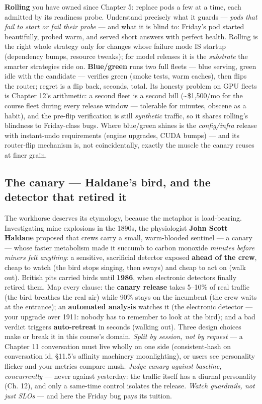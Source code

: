\textbf{Rolling} you have owned since Chapter 5: replace pods a few at a time, each admitted by its readiness probe. Understand precisely what it guards — \textit{pods that fail to start or fail their probe} — and what it is blind to: Friday's pod started beautifully, probed warm, and served short answers with perfect health. Rolling is the right whole strategy only for changes whose failure mode IS startup (dependency bumps, resource tweaks); for model releases it is the \textit{substrate} the smarter strategies ride on. \textbf{Blue/green} runs two full fleets — blue serving, green idle with the candidate — verifies green (smoke tests, warm caches), then flips the router; regret is a flip back, seconds, total. Its honesty problem on GPU fleets is Chapter 12's arithmetic: a second fleet is a second bill (\textasciitilde{}\$1,500/mo for the course fleet during every release window — tolerable for minutes, obscene as a habit), and the pre-flip verification is still \textit{synthetic} traffic, so it shares rolling's blindness to Friday-class bugs. Where blue/green shines is the \textit{config/infra} release with instant-undo requirements (engine upgrades, CUDA bumps) — and its router-flip mechanism is, not coincidentally, exactly the muscle the canary reuses at finer grain.

\subsection*{The canary — Haldane's bird, and the detector that retired it}

The workhorse deserves its etymology, because the metaphor is load-bearing. Investigating mine explosions in the 1890s, the physiologist \textbf{John Scott Haldane} proposed that crews carry a small, warm-blooded sentinel — a canary — whose faster metabolism made it succumb to carbon monoxide \textit{minutes before miners felt anything}: a sensitive, sacrificial detector exposed \textbf{ahead of the crew}, cheap to watch (the bird stops singing, then sways) and cheap to act on (walk out). British pits carried birds until \textbf{1986}, when electronic detectors finally retired them. Map every clause: the \textbf{canary release} takes 5–10\% of real traffic (the bird breathes the real air) while 90\% stays on the incumbent (the crew waits at the entrance); an \textbf{automated analysis} watches it (the electronic detector — your upgrade over 1911: nobody has to remember to look at the bird); and a bad verdict triggers \textbf{auto-retreat} in seconds (walking out). Three design choices make or break it in this course's domain. \textit{Split by session, not by request} — a Chapter 11 conversation must live wholly on one side (consistent-hash on conversation id, §11.5's affinity machinery moonlighting), or users see personality flicker and your metrics compare mush. \textit{Judge canary against baseline, concurrently} — never against yesterday: the traffic itself has a diurnal personality (Ch. 12), and only a same-time control isolates the release. \textit{Watch guardrails, not just SLOs} — and here the Friday bug pays its tuition.

